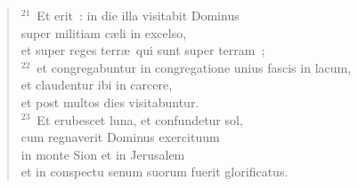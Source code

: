 \begin{verse}
${}^{21}$~Et erit~: in die illa visitabit Dominus\\ super militiam c\ae li in excelso,\\ et super reges terr\ae\ qui sunt super terram~;\\
${}^{22}$~et congregabuntur in congregatione unius fascis in lacum,\\ et claudentur ibi in carcere,\\ et post multos dies visitabuntur.\\
${}^{23}$~Et erubescet luna, et confundetur sol,\\ cum regnaverit Dominus exercituum\\ in monte Sion et in Jerusalem\\ et in conspectu senum suorum fuerit glorificatus.\end{verse}



